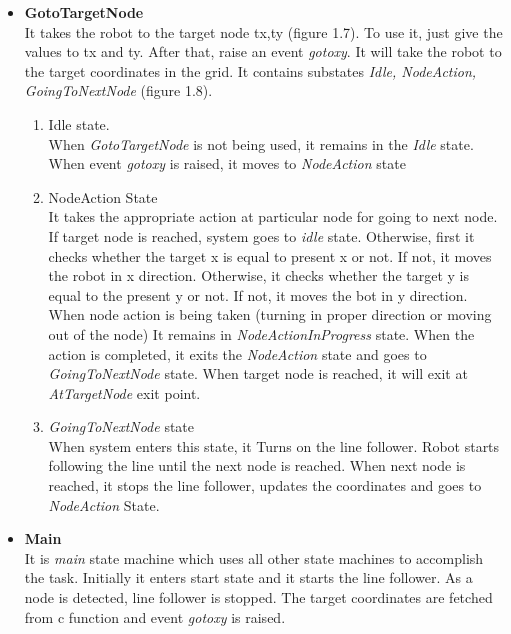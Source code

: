 \documentclass[a4paper,12pt,oneside]{book}
\begin{document}
\begin{itemize}
\item \textbf{GotoTargetNode}\\
It takes the robot to the target node tx,ty (figure 1.7). To use it, just give the values to tx and ty. After that, raise an event \textit{gotoxy}. It will take the robot to the target coordinates in the grid. It contains substates 
	 \textit{Idle, NodeAction, GoingToNextNode} (figure 1.8). 
\begin{enumerate}
\item  Idle state.\\
When \textit{GotoTargetNode} is not being used, it remains in the \textit{Idle} state. When event \textit{gotoxy} is raised, it moves to \textit{NodeAction} state
\item NodeAction State\\
It takes the appropriate action at particular node for going to next node. If target node is reached, system goes to \textit{idle} state. Otherwise, first it checks whether the target x is equal to present x or not. If not, it moves the robot in x direction. Otherwise, it checks whether the target y is equal to the present y or not. If not, it moves the bot in y direction. When node action is being taken (turning in proper direction or moving out of the node) It remains in \textit{NodeActionInProgress} state. When the action is completed, it exits the \textit{NodeAction} state and goes to \textit{GoingToNextNode} state. When target node is reached, it will exit at \textit{AtTargetNode} exit point. 
\item \textit{GoingToNextNode} state\\
When system enters this state, it Turns on the line follower. Robot starts following the line until the next node is reached. When next node is reached, it stops the line follower, updates the coordinates and goes to \textit{NodeAction} State.
\end{enumerate}
\item \textbf{Main}\\ 
It is \textit{main} state machine which uses all other state machines to accomplish the task. Initially it enters start state and it starts the line follower. As a node is detected, line follower is stopped. The target coordinates are fetched from c function and event \textit{gotoxy} is raised.
	\begin{figure}[]
	\centering

\end{figure}
\end{itemize}
\end{document}
